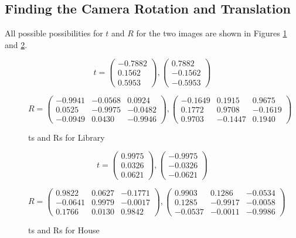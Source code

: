\documentclass[11pt]{article}
\begin{document}
\newpage
\subsection{Finding the Camera Rotation and Translation}
All possible possibilities for $t$ and $R$ for the two images are shown in
Figures \ref{tr_library} and \ref{tr_house}.

\begin{figure}[h!]
  \caption{ts and Rs for Library}
  \label{tr_library}
  \centering
    \[t = \begin{pmatrix}
      -0.7882\\
      0.1562\\
      0.5953
    \end{pmatrix}, 
    \begin{pmatrix}
      0.7882\\
      -0.1562\\
      -0.5953
    \end{pmatrix}\]

    \[R = \begin{pmatrix}
      -0.9941&-0.0568&0.0924\\
       0.0525&-0.9975&-0.0482\\
      -0.0949& 0.0430&-0.9946
    \end{pmatrix},
    \begin{pmatrix}
      -0.1649&0.1915&0.9675\\
      0.1772& 0.9708&-0.1619\\
      0.9703&-0.1447&0.1940
    \end{pmatrix}\]
\end{figure}

\begin{figure}[h!]
  \caption{ts and Rs for House}
  \label{tr_house}
  \centering
    \[t = \begin{pmatrix}
      0.9975\\
      0.0326\\
      0.0621
    \end{pmatrix}, 
    \begin{pmatrix}
      -0.9975\\
      -0.0326\\
      -0.0621
    \end{pmatrix}\]

    \[R = \begin{pmatrix}
      0.9822&0.0627&-0.1771\\
     -0.0641&0.9979&-0.0017\\
      0.1766&0.0130&0.9842
    \end{pmatrix},
    \begin{pmatrix}
      0.9903&0.1286&-0.0534\\
      0.1285&-0.9917&-0.0058\\
      -0.0537&-0.0011&-0.9986
    \end{pmatrix}\]
\end{figure}
\end{document}
